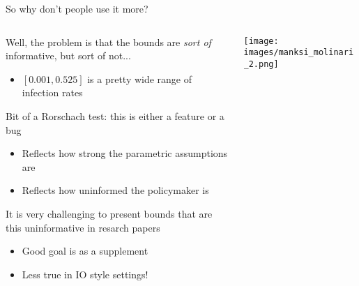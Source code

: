 \documentclass[notes,11pt, aspectratio=169]{beamer}
\newenvironment{wideitemize}{\itemize\addtolength{\itemsep}{10pt}}{\enditemize}
\begin{document}
  
\begin{frame}{So why don't people use it more?}
      \begin{columns}[onlytextwidth, T] %
        \begin{column}{.5\textwidth}
          \begin{wideitemize}
          \item Well, the problem is that the bounds are \emph{sort of} informative, but sort of not...
            \begin{itemize}
            \item $[0.001,0.525]$ is a pretty wide range of infection rates
            \end{itemize}
          \item Bit of a Rorschach test: this is either a feature or a
            bug
            \begin{itemize}
            \item Reflects how strong the parametric assumptions are
            \item Reflects how uninformed the policymaker is
            \end{itemize}
          \item It is very challenging to present bounds that are this
            uninformative in resarch papers
            \begin{itemize}
            \item Good goal is as a supplement
            \item Less true in IO style settings!
            \end{itemize}
          \end{wideitemize}
      \end{column}%
      \hfill%
      \begin{column}{.5\textwidth}
        \texttt{[image: images/manksi\_molinari\_2.png]}
      \end{column}%
    \end{columns}
\end{frame}
\end{document}

